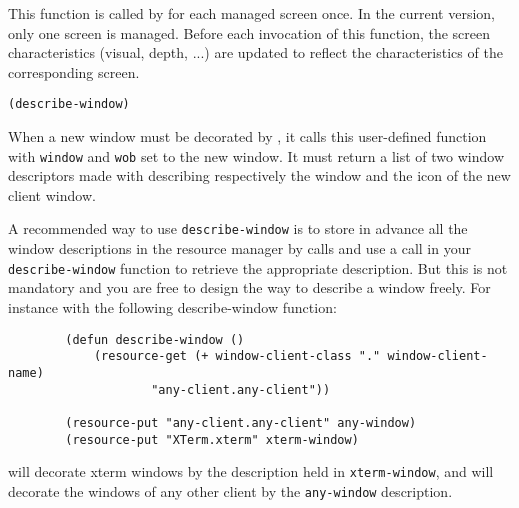 
This function is called by {\GWM} for each managed screen once. In the
current version, only one screen is managed. Before each invocation of this
function, the screen characteristics (visual, depth, ...) are updated to
reflect the characteristics of the corresponding screen.

        
{\usagefont\begin{verbatim}
(describe-window)
\end{verbatim}}\usageupspace

When a new window must be decorated by {\GWM}, it calls this user-defined
function with \verb"window" and \verb"wob" set to the new window. It must
return a list of two window descriptors made with 
describing respectively the window and the icon of the new client window.

A recommended way to use \verb"describe-window"  is to store in advance all
the window descriptions in the resource manager by  calls
and use a  call in your \verb"describe-window" function to
retrieve the appropriate description. But this is not mandatory and you are
free to design the way to describe a window freely.  For instance with the
following describe-window function:

{\exemplefont\begin{verbatim}
        (defun describe-window ()
            (resource-get (+ window-client-class "." window-client-name)
                    "any-client.any-client"))

        (resource-put "any-client.any-client" any-window)
        (resource-put "XTerm.xterm" xterm-window)
\end{verbatim}}

{\GWM} will decorate xterm windows by the description held in
\verb"xterm-window", and will decorate the windows of any other client by
the \verb"any-window" description.

